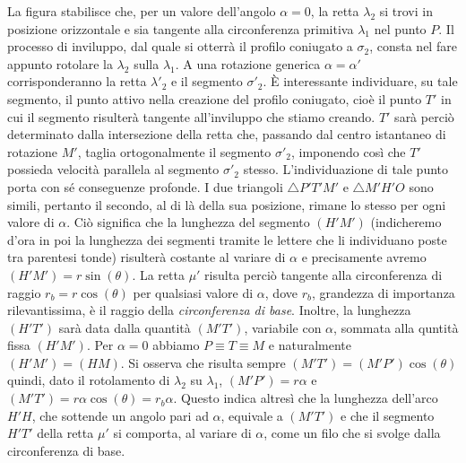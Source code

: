 La figura stabilisce che, per un valore dell'angolo
 $\alpha =0$, la retta  $\lambda_2$
si trovi in posizione orizzontale e sia tangente alla
 circonferenza primitiva $\lambda_1$ nel
punto $P$.
 Il processo di inviluppo, dal quale si otterr\`a il profilo coniugato
a $\sigma_2$, consta nel fare appunto rotolare la $\lambda_2$ sulla $\lambda_1$.
A una rotazione generica $\alpha=\alpha'$ corrisponderanno
la retta $\lambda'_2$ e il segmento
$\sigma'_2$.
\`E interessante individuare, su tale segmento, il punto
attivo nella creazione del profilo coniugato, cio\`e il punto $T'$
in cui il segmento
risulter\`a tangente all'inviluppo che stiamo creando.
$T'$ sar\`a perci\`o determinato
dalla intersezione della retta che, passando dal centro istantaneo di rotazione
$M'$, taglia ortogonalmente il segmento $\sigma'_2$, imponendo cos\`i che $T'$
possieda velocit\`a
parallela al segmento $\sigma'_2$ stesso.
L'individuazione di tale punto porta con s\'e
conseguenze profonde. I due triangoli $ \triangle{P' T' M'}$ e
 $\triangle{M'H'O}$
sono simili, pertanto il secondo, al di l\`a della
sua posizione, rimane lo stesso per ogni valore di $\alpha$.
Ci\`o significa che la lunghezza del segmento $(H'M')$ (indicheremo d'ora in poi
la lunghezza dei segmenti tramite le lettere che li individuano poste tra
parentesi tonde) risulter\`a
costante al variare di $\alpha$ e precisamente avremo $(H'M')= r\sin(\theta)$.
La retta $\mu'$ risulta perci\`o tangente alla
circonferenza di raggio $r_b= r \cos(\theta)$ per qualsiasi valore di $\alpha$,
dove $r_b$, grandezza di importanza rilevantissima, \`e il raggio della
{\em circonferenza di base}.
Inoltre, la lunghezza $(H'T')$ sar\`a data dalla quantit\`a 
$(M'T')$, variabile con $\alpha$, sommata alla quntit\`a fissa $(H'M')$.
Per  $\alpha=0$ abbiamo $P\equiv T\equiv M$
e naturalmente  $(H'M')=(HM)$. 
Si osserva che risulta
sempre  $(M'T')=(M'P')\cos(\theta)$ quindi, dato il rotolamento di $\lambda_2$ 
su $\lambda_1$, $(M'P')=r\alpha$ e $(M'T')=r\alpha\cos(\theta)=r_b \alpha$.
Questo indica altres\`i
che la lunghezza dell'arco $H'H$,  che sottende un angolo pari ad $\alpha$,
equivale a
$(M'T')$ e che il segmento $H'T'$ della retta $\mu'$ si comporta, al variare di
$\alpha$, come un filo che si svolge dalla circonferenza di base.

